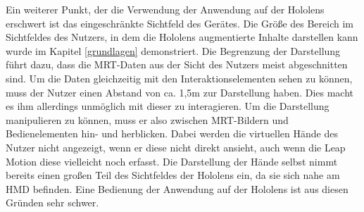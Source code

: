 Ein weiterer Punkt, der die Verwendung der Anwendung auf der Hololens erschwert ist das eingeschränkte Sichtfeld des Gerätes. Die Größe des Bereich im Sichtfeldes des Nutzers, in dem die Hololens augmentierte Inhalte darstellen kann wurde im Kapitel \ref{grundlagen} demonstriert. 
Die Begrenzung der Darstellung führt dazu, dass die MRT-Daten aus der Sicht des Nutzers meist abgeschnitten sind. Um die Daten gleichzeitig mit den Interaktionselementen sehen zu können, muss der Nutzer einen Abstand von ca. 1,5m zur Darstellung haben. Dies macht es ihm allerdings unmöglich mit dieser zu interagieren. Um die Darstellung manipulieren zu können, muss er also zwischen MRT-Bildern und Bedienelementen hin- und herblicken. Dabei werden die virtuellen Hände des Nutzer nicht angezeigt, wenn er diese nicht direkt ansieht, auch wenn die Leap Motion diese vielleicht noch erfasst. 
Die Darstellung der Hände selbst nimmt bereits einen großen Teil des Sichtfeldes der Hololens ein, da sie sich nahe am HMD befinden. 
Eine Bedienung der Anwendung auf der Hololens ist aus diesen Gründen sehr schwer. 


